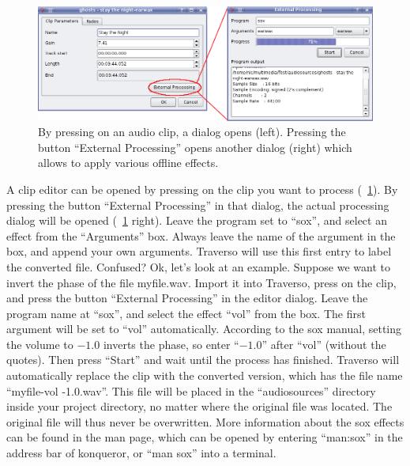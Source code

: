 \begin{figure}
	\centering
	\includegraphics[width=\textwidth]{images/external00}
	\caption{By pressing  on an audio clip, a dialog opens (left). Pressing the button ``External Processing'' opens another dialog (right) which allows to apply various offline effects.}
	\label{fig_external01}
\end{figure}

A clip editor can be opened by pressing  on the clip you want to process (\FigB~\ref{fig_external01}). By pressing the button ``External Processing'' in that dialog, the actual processing dialog will be opened (\FigB~\ref{fig_external01} right). Leave the program set to ``sox'', and select an effect from the ``Arguments'' box. Always leave the name of the argument in the box, and append your own arguments. Traverso will use this first entry to label the converted file. Confused? Ok, let's look at an example. Suppose we want to invert the phase of the file myfile.wav. Import it into Traverso, press  on the clip, and press the button ``External Processing'' in the editor dialog. Leave the program name at ``sox'', and select the effect ``vol'' from the box. The first argument will be set to ``vol'' automatically. According to the sox manual, setting the volume to $-1.0$ inverts the phase, so enter ``$-1.0$'' after ``vol'' (without the quotes). Then press ``Start'' and wait until the process has finished. Traverso will automatically replace the clip with the converted version, which has the file name ``myfile-vol -1.0.wav''. This file will be placed in the ``audiosources'' directory inside your project directory, no matter where the original file was located. The original file will thus never be overwritten. More information about the sox effects can be found in the man page, which can be opened by entering ``man:sox'' in the address bar of konqueror, or ``man sox'' into a terminal.
